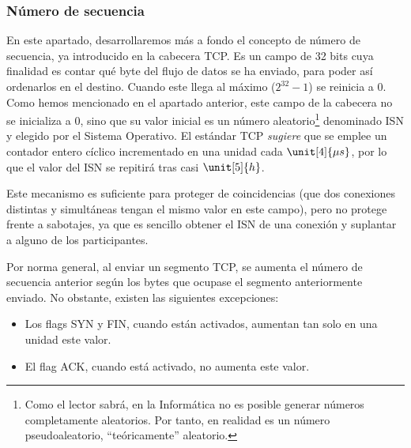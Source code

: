 \subsubsection{Número de secuencia}

En este apartado, desarrollaremos más a fondo el concepto de número de secuencia, ya introducido en la cabecera \acrshort{TCP}. Es un campo de 32 bits cuya finalidad es contar qué byte del flujo de datos se ha enviado, para poder así ordenarlos en el destino. Cuando este llega al máximo ($2^{32}-1$) se reinicia a $0$.\\

Como hemos mencionado en el apartado anterior, este campo de la cabecera no se inicializa a $0$, sino que su valor inicial es un número aleatorio\footnote{Como el lector sabrá, en la Informática no es posible generar números completamente aleatorios. Por tanto, en realidad es un número pseudoaleatorio, ``teóricamente'' aleatorio.} denominado \acrfull{ISN} y elegido por el Sistema Operativo. El estándar \acrshort{TCP} \emph{sugiere} que se emplee un contador entero cíclico incrementado en una unidad cada $\unit[4]{\mu s}$, por lo que el valor del \acrshort{ISN} se repitirá tras casi $\unit[5]{h}$.
\begin{observacion}
    Este mecanismo es suficiente para proteger de coincidencias (que dos conexiones distintas y simultáneas tengan el mismo valor en este campo), pero no protege frente a sabotajes, ya que es sencillo obtener el \acrshort{ISN} de una conexión y suplantar a alguno de los participantes.
\end{observacion}

Por norma general, al enviar un segmento \acrshort{TCP}, se aumenta el número de secuencia anterior según los bytes que ocupase el segmento anteriormente enviado. No obstante, existen las siguientes excepciones:
\begin{itemize}
    \item Los flags SYN y FIN, cuando están activados, aumentan tan solo en una unidad este valor.
    \item El flag ACK, cuando está activado, no aumenta este valor.
\end{itemize}

